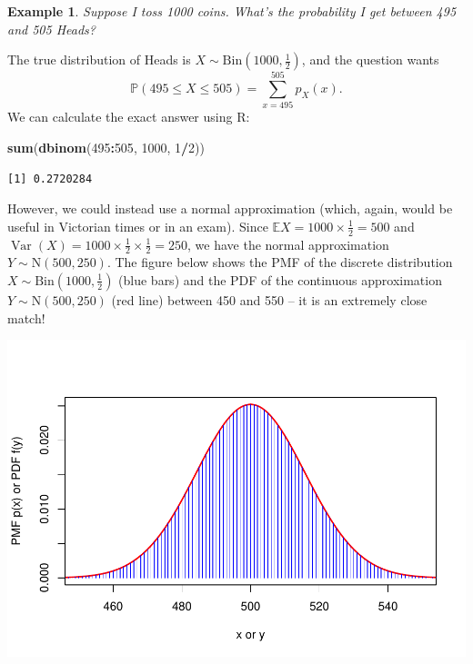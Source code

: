 \documentclass[
  a4paper,
]{book}
\newenvironment{Shaded}{\begin{snugshade}}{\end{snugshade}}
\newcommand{\DecValTok}[1]{\textcolor[rgb]{0.00,0.00,0.81}{#1}}
\newcommand{\FunctionTok}[1]{\textcolor[rgb]{0.13,0.29,0.53}{\textbf{#1}}}
\newcommand{\NormalTok}[1]{#1}
\newcommand{\SpecialCharTok}[1]{\textcolor[rgb]{0.81,0.36,0.00}{\textbf{#1}}}
\theoremstyle{definition}
\theoremstyle{definition}
\newtheorem{example}{Example}[chapter]
\theoremstyle{definition}
\theoremstyle{definition}
\theoremstyle{remark}
\begin{document}
\begin{example}
\emph{Suppose I toss 1000 coins. What's the probability I get between 495 and 505 Heads?}

The true distribution of Heads is \(X \sim \mathrm{Bin}(1000, \frac12)\), and the question wants
\[ \mathbb P(495 \leq X \leq 505) = \sum_{x = 495}^{505} p_X(x) . \]
We can calculate the exact answer using R:

\begin{Shaded}
\begin{Highlighting}[]
\FunctionTok{sum}\NormalTok{(}\FunctionTok{dbinom}\NormalTok{(}\DecValTok{495}\SpecialCharTok{:}\DecValTok{505}\NormalTok{, }\DecValTok{1000}\NormalTok{, }\DecValTok{1}\SpecialCharTok{/}\DecValTok{2}\NormalTok{))}
\end{Highlighting}
\end{Shaded}

\begin{verbatim}
[1] 0.2720284
\end{verbatim}

However, we could instead use a normal approximation (which, again, would be useful in Victorian times or in an exam). Since \(\mathbb EX = 1000 \times \frac12 = 500\) and \(\operatorname{Var}(X) = 1000 \times \frac12 \times \frac12 = 250\), we have the normal approximation \(Y \sim \mathrm N(500, 250)\). The figure below shows the PMF of the discrete distribution \(X \sim \mathrm{Bin}(1000, \frac12)\) (blue bars) and the PDF of the continuous approximation \(Y\sim \mathrm N(500, 250)\) (red line) between 450 and 550 -- it is an extremely close match!

\includegraphics{math1710_files/figure-latex/norm-bin-1.pdf}


\end{example}
\end{document}
